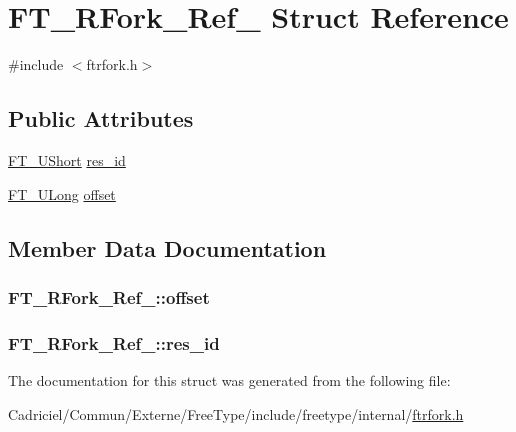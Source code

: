 \hypertarget{struct_f_t___r_fork___ref__}{\section{F\-T\-\_\-\-R\-Fork\-\_\-\-Ref\-\_\- Struct Reference}
\label{struct_f_t___r_fork___ref__}
}


{\ttfamily \#include $<$ftrfork.\-h$>$}

\subsection*{Public Attributes}
\begin{DoxyCompactItemize}
\item 
\hyperlink{fttypes_8h_a937f6c17cf5ffd09086d8610c37b9f58}{F\-T\-\_\-\-U\-Short} \hyperlink{struct_f_t___r_fork___ref___a7bca14bddf56df7903166b52e19a0500}{res\-\_\-id}
\item 
\hyperlink{fttypes_8h_a4fac88bdba78eb76b505efa6e4fbf3f5}{F\-T\-\_\-\-U\-Long} \hyperlink{struct_f_t___r_fork___ref___af84c349a29b40c42a788927b113f9ecf}{offset}
\end{DoxyCompactItemize}


\subsection{Member Data Documentation}
\hypertarget{struct_f_t___r_fork___ref___af84c349a29b40c42a788927b113f9ecf}{
\subsubsection[{offset}]{ F\-T\-\_\-\-R\-Fork\-\_\-\-Ref\-\_\-\-::offset}}\label{struct_f_t___r_fork___ref___af84c349a29b40c42a788927b113f9ecf}
\hypertarget{struct_f_t___r_fork___ref___a7bca14bddf56df7903166b52e19a0500}{
\subsubsection[{res\-\_\-id}]{ F\-T\-\_\-\-R\-Fork\-\_\-\-Ref\-\_\-\-::res\-\_\-id}}\label{struct_f_t___r_fork___ref___a7bca14bddf56df7903166b52e19a0500}


The documentation for this struct was generated from the following file\-:\begin{DoxyCompactItemize}
\item 
Cadriciel/\-Commun/\-Externe/\-Free\-Type/include/freetype/internal/\hyperlink{ftrfork_8h}{ftrfork.\-h}\end{DoxyCompactItemize}
